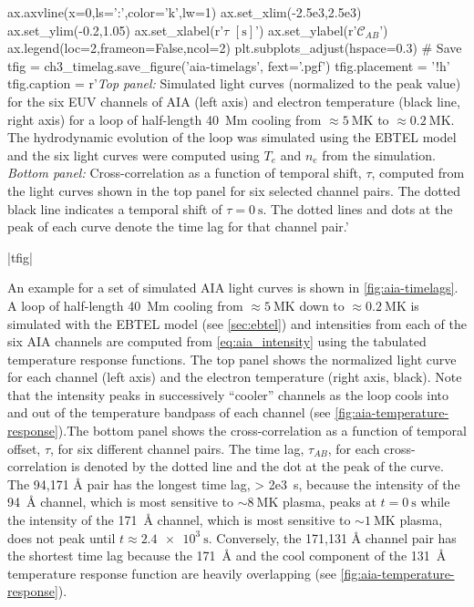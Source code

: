 \begin{pycode}
ax.axvline(x=0,ls=':',color='k',lw=1)
ax.set_xlim(-2.5e3,2.5e3)
ax.set_ylim(-0.2,1.05)
ax.set_xlabel(r'$\tau$ $[\si{\second}]$')
ax.set_ylabel(r'$\mathcal{C}_{AB}$')
ax.legend(loc=2,frameon=False,ncol=2)
plt.subplots_adjust(hspace=0.3)
# Save
tfig = ch3_timelag.save_figure('aia-timelags', fext='.pgf')
tfig.placement = '!h'
tfig.caption = r'\textit{Top panel:} Simulated light curves (normalized to the peak value) for the six EUV channels of AIA (left axis) and electron temperature (black line, right axis) for a loop of half-length \SI{40}{\mega\m} cooling from $\approx\SI{5}{\mega\kelvin}$ to $\approx\SI{0.2}{\mega\kelvin}$. The hydrodynamic evolution of the loop was simulated using the EBTEL model and the six light curves were computed using $T_e$ and $n_e$ from the simulation. \textit{Bottom panel:} Cross-correlation as a function of temporal shift, $\tau$, computed from the light curves shown in the top panel for six selected channel pairs. The dotted black line indicates a temporal shift of $\tau=\SI{0}{\second}$. The dotted lines and dots at the peak of each curve denote the time lag for that channel pair.'
\end{pycode}
|tfig|

An example for a set of simulated AIA light curves is shown in \autoref{fig:aia-timelags}. A loop of half-length \SI{40}{\mega\m} cooling from $\approx\SI{5}{\mega\kelvin}$ down to $\approx\SI{0.2}{\mega\kelvin}$ is simulated with the EBTEL model (see \autoref{sec:ebtel}) and intensities from each of the six AIA channels are computed from \autoref{eq:aia_intensity} using the tabulated temperature response functions. The top panel shows the normalized light curve for each channel (left axis) and the electron temperature (right axis, black). Note that the intensity peaks in successively ``cooler'' channels as the loop cools into and out of the temperature bandpass of each channel (see \autoref{fig:aia-temperature-response}).The bottom panel shows the cross-correlation as a function of temporal offset, $\tau$, for six different channel pairs. The time lag, $\tau_{AB}$, for each cross-correlation is denoted by the dotted line and the dot at the peak of the curve. The 94,171 \si{\angstrom} pair has the longest time lag, \SI{> 2e3}{\second}, because the intensity of the \SI{94}{\angstrom} channel, which is most sensitive to $\sim\SI{8}{\mega\kelvin}$ plasma, peaks at $t=\SI{0}{\second}$ while the intensity of the \SI{171}{\angstrom} channel, which is most sensitive to $\sim\SI{1}{\mega\kelvin}$ plasma, does not peak until $t\approx\SI{2.4e3}{\second}$. Conversely, the 171,131 \si{\angstrom} channel pair has the shortest time lag because the \SI{171}{\angstrom} and the cool component of the \SI{131}{\angstrom} temperature response function are heavily overlapping (see \autoref{fig:aia-temperature-response}). 

